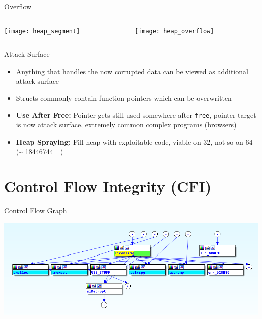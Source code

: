 \documentclass[beamer]{uibk}
\begin{document}
\begin{frame}{Overflow}
    \begin{columns}
        \begin{column}{0.5\textwidth}
            \begin{center}
                \texttt{[image: heap\_segment]}
            \end{center}
        \end{column}
        \begin{column}{0.5\textwidth}
            \begin{center}
                \texttt{[image: heap\_overflow]}
            \end{center}
        \end{column}
    \end{columns}
\end{frame}

\begin{frame}{Attack Surface}
    \begin{itemize}
        \item Anything that handles the now corrupted data can be viewed as
            additional attack surface
        \medskip
        \pause
        \item Structs commonly contain function pointers which can be
            overwritten
        \bigskip
        \pause
        \item \textbf{Use After Free:} Pointer gets still used somewhere after
            \texttt{free}, pointer target is now attack surface, extremely
            common complex programs (browsers)
        \medskip
        \item \textbf{Heap Spraying:} Fill heap with exploitable code, viable
            on \SI{32}{\bit}, not so on \SI{64}{\bit} (\textasciitilde
            \SI{18446744}{\tera\byte})
    \end{itemize}
\end{frame}

\section{Control Flow Integrity (CFI)}

\begin{frame}{Control Flow Graph}
    \begin{center}
        \includegraphics[width=\textwidth]{gfx/unraid_part_graph.png}
    \end{center}
\end{frame}
\end{document}
